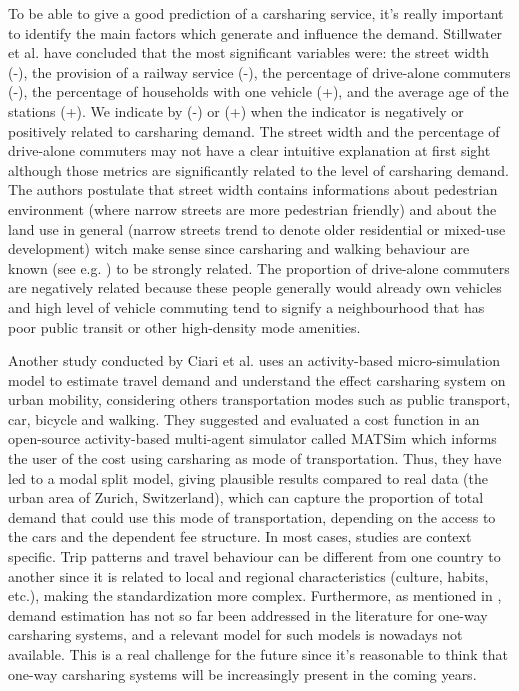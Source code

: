 \begin{bibunit}[ieeetr]
\medskip
To be able to give a good prediction of a carsharing service, it's really important to identify the main factors which generate and influence the demand.
Stillwater et al. \cite{stillwater_carsharing_2009} have concluded that the most significant variables were: the street width (-), the provision of a railway service (-), the percentage of drive-alone commuters (-), the percentage of households with one vehicle (+), and the average age of the stations (+).
We indicate by (-) or (+) when the indicator is negatively or positively related to carsharing demand.
The street width and the percentage of drive-alone commuters may not have a clear intuitive explanation at first sight although those metrics are significantly related to the level of carsharing demand.
The authors postulate that street width contains informations about pedestrian environment (where narrow streets are more pedestrian friendly) and about the land use in general (narrow streets trend to denote older residential or mixed-use development) witch make sense since carsharing and walking behaviour are known (see e.g. \cite{cervero_city_2003}) to be strongly related.
The proportion of drive-alone commuters are negatively related because these people generally would already own vehicles and high level of vehicle commuting tend to signify a neighbourhood that has poor public transit or other high-density mode amenities.

\medskip
Another study conducted by Ciari et al. \cite{ciari_estimation_2013} uses an activity-based micro-simulation model to estimate travel demand and understand the effect carsharing system on urban mobility, considering others transportation modes such as public transport, car, bicycle and walking.
They suggested and evaluated a cost function in an open-source activity-based multi-agent simulator called MATSim \cite{matsim_webPage} which informs the user of the cost using carsharing as mode of transportation.
Thus, they have led to a modal split model, giving plausible results compared to real data (the urban area of Zurich, Switzerland), which can capture the proportion of total demand that could use this mode of transportation, depending on the access to the cars and the dependent fee structure.
In most cases, studies are context specific.
Trip patterns and travel behaviour can be different from one country to another since it is related to local and regional characteristics (culture, habits, etc.), making the standardization more complex.
Furthermore, as mentioned in \cite{jorge_carsharing_2013}, demand estimation has not so far been addressed in the literature for one-way carsharing systems, and a relevant model for such models is nowadays not available.
This is a real challenge for the future since it's reasonable to think that one-way carsharing systems will be increasingly present in the coming years.


\end{bibunit}
